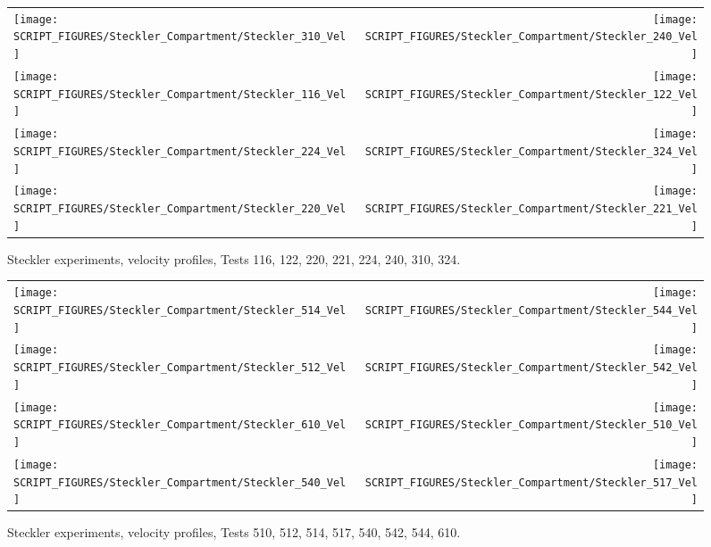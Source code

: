 \begin{figure}[p]
\begin{tabular*}{\textwidth}{l@{\extracolsep{\fill}}r}
\texttt{[image: SCRIPT\_FIGURES/Steckler\_Compartment/Steckler\_310\_Vel]} &
\texttt{[image: SCRIPT\_FIGURES/Steckler\_Compartment/Steckler\_240\_Vel]} \\
\texttt{[image: SCRIPT\_FIGURES/Steckler\_Compartment/Steckler\_116\_Vel]} &
\texttt{[image: SCRIPT\_FIGURES/Steckler\_Compartment/Steckler\_122\_Vel]} \\
\texttt{[image: SCRIPT\_FIGURES/Steckler\_Compartment/Steckler\_224\_Vel]} &
\texttt{[image: SCRIPT\_FIGURES/Steckler\_Compartment/Steckler\_324\_Vel]} \\
\texttt{[image: SCRIPT\_FIGURES/Steckler\_Compartment/Steckler\_220\_Vel]} &
\texttt{[image: SCRIPT\_FIGURES/Steckler\_Compartment/Steckler\_221\_Vel]}
\end{tabular*}
\caption{Steckler experiments, velocity profiles, Tests 116, 122, 220, 221, 224, 240, 310, 324.}
\label{Steckler_Vel_4}
\end{figure}

\begin{figure}[p]
\begin{tabular*}{\textwidth}{l@{\extracolsep{\fill}}r}
\texttt{[image: SCRIPT\_FIGURES/Steckler\_Compartment/Steckler\_514\_Vel]} &
\texttt{[image: SCRIPT\_FIGURES/Steckler\_Compartment/Steckler\_544\_Vel]} \\
\texttt{[image: SCRIPT\_FIGURES/Steckler\_Compartment/Steckler\_512\_Vel]} &
\texttt{[image: SCRIPT\_FIGURES/Steckler\_Compartment/Steckler\_542\_Vel]} \\
\texttt{[image: SCRIPT\_FIGURES/Steckler\_Compartment/Steckler\_610\_Vel]} &
\texttt{[image: SCRIPT\_FIGURES/Steckler\_Compartment/Steckler\_510\_Vel]} \\
\texttt{[image: SCRIPT\_FIGURES/Steckler\_Compartment/Steckler\_540\_Vel]} &
\texttt{[image: SCRIPT\_FIGURES/Steckler\_Compartment/Steckler\_517\_Vel]}
\end{tabular*}
\caption{Steckler experiments, velocity profiles, Tests 510, 512, 514, 517, 540, 542, 544, 610.}
\label{Steckler_Vel_5}
\end{figure}

